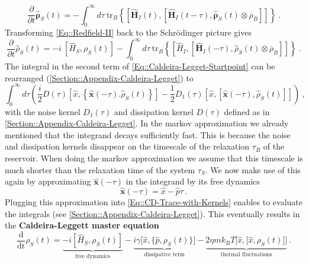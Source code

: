 	\begin{equation} \label{Eq::Redfield-II}
		\frac{\partial}{\partial t} \boldsymbol{\hat{\rho}}_S(t) = - \int_{0}^{\infty} d\tau~ \text{tr}_B \left\{  \left[\boldsymbol{\hat{H}}_I(t), \left[\boldsymbol{\hat{H}}_I(t - \tau), \boldsymbol{\hat{\rho}}_S(t) \otimes \overline{\rho}_B \right]\right]  \right\} ~.
	\end{equation}
	Transforming \autoref{Eq::Redfield-II} back to the Schrödinger picture gives
	\begin{equation} \label{Eq::Caldeira-Legget-Startpoint}
		\frac{\partial}{\partial t} {\hat{\rho}}_S(t) =	-i~\left[\hat{H}_S, \rho_S(t)\right] - \int_{0}^{\infty} d\tau~ \text{tr}_B \left\{  \left[{\hat{H}}_I, \left[{\boldsymbol{\hat{H}}}_I(- \tau), {\hat{\rho}}_S(t) \otimes \overline{\rho}_B \right]\right]  \right\}~.
	\end{equation}
	The integral in the second term of \autoref{Eq::Caldeira-Legget-Startpoint} can be rearranged (\autoref{Section::Appendix-Caldeira-Legget}) to 
	\begin{equation} \label{Eq::CD-Trace-with-Kernels}
		\int_{0}^{\infty} d\tau \left(\frac{i}{2} D(\tau) \left[\hat{x}, \left\{\boldsymbol{\hat{x}}(-\tau). \hat{\rho}_S(t)\right\}\right] - \frac{1}{2} D_1(\tau) \left[\hat{x}, \left[\boldsymbol{\hat{x}}(-\tau) , \hat{\rho}_S(t)\right]\right]\right)~,
	\end{equation}
	with the noise kernel $D_1(\tau)$ and dissipation kernel $D(\tau)$ defined as in \autoref{Section::Appendix-Caldeira-Legget}. In the markov approximation we already mentioned that the integrand decays sufficiently fast. This is because the noise and dissipation kernels disappear on the timescale of the relaxation $\tau_B$ of the reservoir. When doing the markov approximation we assume that this timescale is much shorter than the relaxation time of the system $\tau_S$. We now make use of this again by approximating $\boldsymbol{\hat{x}}(-\tau)$ in the integrand by its free dynamics
	\begin{equation}
		\boldsymbol{\hat{x}}(-\tau) =	\hat{x} - \hat{p} \tau~.
	\end{equation}
	Plugging this approximation into \autoref{Eq::CD-Trace-with-Kernels} enables to evaluate the integrals (see \autoref{Section::Appendix-Caldeira-Legget}). This eventually results in the \textbf{Caldeira-Leggett master equation}
	\begin{equation} \label{Eq::Caldeira-Leggett-Master-equation}
		\frac{\text{d}}{\text{dt}} \rho_S(t) =	\underbrace{-i\left[\hat{H}_S, \rho_S(t) \right]}_{\text{free dynamics}} - \underbrace{i \gamma \Big [\hat{x}, \big\{\hat{p}, \rho_S(t)\big\}\Big ]}_\text{dissipative term} - \underbrace{2 \eta m k_B T \Big [\hat{x}, \big[\hat{x}, \rho_S(t)\big]\Big ]}_\text{thermal fluctuations}~.
	\end{equation}
